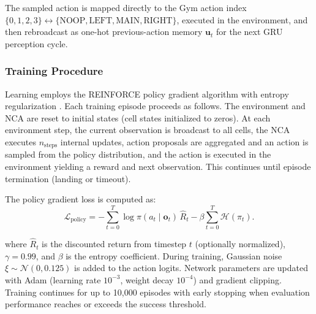 \documentclass[letterpaper]{article}
\newcommand{\bh}[1]{{\color{black}#1}}  %
\begin{document}
The sampled action is mapped directly to the Gym action index
$\{0,1,2,3\}\!\leftrightarrow\!\{\text{NOOP},\text{LEFT},\text{MAIN},\text{RIGHT}\}$,
executed in the environment, and then rebroadcast as one-hot previous-action memory
$\mathbf{u}_t$ for the next \bh{GRU perception cycle.}

\subsubsection{Training Procedure}

Learning employs the REINFORCE policy gradient algorithm with entropy regularization \cite{williams1992simple}. Each training episode proceeds as follows. The environment and NCA are reset to initial states (cell states initialized to zeros). At each environment step, the current observation is broadcast to all cells, the NCA executes $n_{\text{steps}}$ internal updates, action proposals are aggregated and an action is sampled from the policy distribution, and the action is executed in the environment yielding a reward and next observation. 
This continues until episode termination (landing or timeout).

The policy gradient loss is computed as:
\bh{
\begin{equation}
\mathcal{L}_{\text{policy}} = -\sum_{t=0}^{T} \log \pi(a_t \mid \mathbf{o}_t)\,\hat{R}_t - \beta\sum_{t=0}^{T}\mathcal{H}(\pi_t).
\end{equation}
}



where $\hat{R}_t$ is the discounted return from timestep $t$ (optionally normalized),
$\gamma = 0.99$, and $\beta$ is the entropy coefficient. 
\bh{During training, Gaussian noise $\xi \sim \mathcal{N}(0, 0.125)$ is added to the action logits.}
Network parameters are updated with Adam (learning rate $10^{-3}$, weight decay $10^{-4}$) and gradient clipping.
Training continues for up to 10,000 episodes with early stopping when evaluation
performance reaches or exceeds the success threshold.
\end{document}
